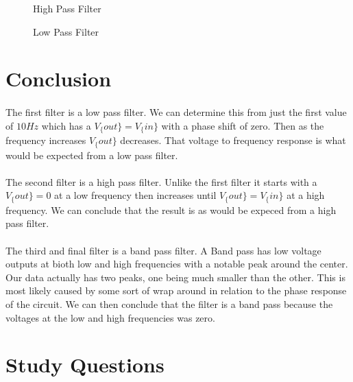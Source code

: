 \documentclass{article}
\begin{document}
\begin{figure}[!ht]
\caption{High Pass Filter}
\begin{center}

\end{center}
\end{figure}


\begin{figure}[!ht]
\caption{Low Pass Filter}
\begin{center}

\end{center}
\end{figure}

\clearpage

\section*{Conclusion}
\paragraph{}
The first filter is a low pass filter. We can determine this from just the first value of $10Hz$ which has a 
$V_\{out\} = V_\{in\}$ with a phase shift of zero. Then as the frequency increases $V_\{out\}$ decreases. That
voltage to frequency response is what would be expected from a low pass filter.
\paragraph{}
The second filter is a high pass filter. Unlike the first filter it starts with a $V_\{out\} = 0$ at a low frequency
 then increases until $V_\{out\} = V_\{in\}$ at a high frequency. We can conclude that the result is as would be 
 expeced from a high pass filter.
 \paragraph{}
 The third and final filter is a band pass filter. A Band pass has low voltage outputs at bioth low and high frequencies 
 with a notable peak around the center. Our data actually has two peaks, one being much smaller than the other. This 
 is most likely caused by some sort of wrap around in relation to the phase response of the circuit. We can then conclude
 that the filter is a band pass because the voltages at the low and high frequencies was zero.

\section*{Study Questions}
\end{document}
